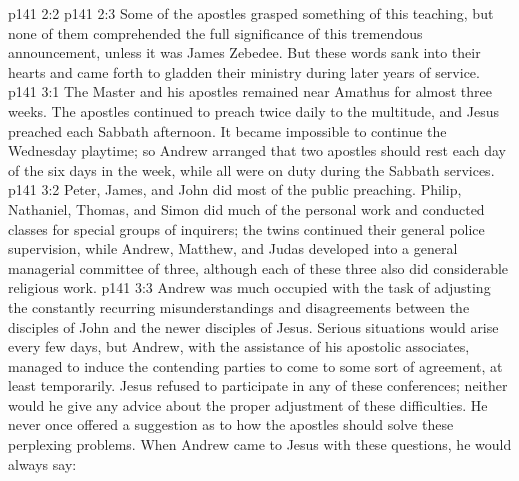 \vs p141 2:2 
\vs p141 2:3 Some of the apostles grasped something of this teaching, but none of them comprehended the full significance of this tremendous announcement, unless it was James Zebedee. But these words sank into their hearts and came forth to gladden their ministry during later years of service.
\vs p141 3:1 The Master and his apostles remained near Amathus for almost three weeks. The apostles continued to preach twice daily to the multitude, and Jesus preached each Sabbath afternoon. It became impossible to continue the Wednesday playtime; so Andrew arranged that two apostles should rest each day of the six days in the week, while all were on duty during the Sabbath services.
\vs p141 3:2 Peter, James, and John did most of the public preaching. Philip, Nathaniel, Thomas, and Simon did much of the personal work and conducted classes for special groups of inquirers; the twins continued their general police supervision, while Andrew, Matthew, and Judas developed into a general managerial committee of three, although each of these three also did considerable religious work.
\vs p141 3:3 Andrew was much occupied with the task of adjusting the constantly recurring misunderstandings and disagreements between the disciples of John and the newer disciples of Jesus. Serious situations would arise every few days, but Andrew, with the assistance of his apostolic associates, managed to induce the contending parties to come to some sort of agreement, at least temporarily. Jesus refused to participate in any of these conferences; neither would he give any advice about the proper adjustment of these difficulties. He never once offered a suggestion as to how the apostles should solve these perplexing problems. When Andrew came to Jesus with these questions, he would always say: 
